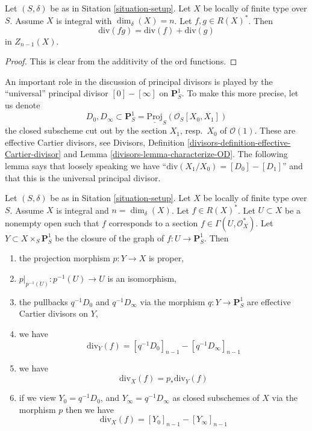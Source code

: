 \begin{lemma}
\label{lemma-div-additive}
Let $(S, \delta)$ be as in Sitation \ref{situation-setup}.
Let $X$ be locally of finite type over $S$. Assume $X$ is
integral with $\dim_\delta(X) = n$.
Let $f, g \in R(X)^*$.
Then
$$
\text{div}(fg) = \text{div}(f) + \text{div}(g)
$$
in $Z_{n - 1}(X)$.
\end{lemma}

\begin{proof}
This is clear from the additivity of the $\text{ord}$ functions.
\end{proof}

\noindent
An important role in the discussion of principal divisors
is played by the ``universal'' principal divisor $[0] - [\infty]$
on $\mathbf{P}^1_S$. To make this more precise, let us denote
$$
D_0, D_\infty \subset
\mathbf{P}^1_S = \underline{\text{Proj}}_S(\mathcal{O}_S[X_0, X_1])
$$
the closed subscheme cut out by the section $X_1$, resp.\ $X_0$
of $\mathcal{O}(1)$. These are effective Cartier divisors, see
Divisors, Definition \ref{divisors-definition-effective-Cartier-divisor}
and Lemma \ref{divisors-lemma-characterize-OD}.
The following lemma says that loosely speaking we have
``$\text{div}(X_1/X_0) = [D_0] - [D_1]$'' and that this is the
universal principal divisor.

\begin{lemma}
\label{lemma-rational-function}
Let $(S, \delta)$ be as in Sitation \ref{situation-setup}.
Let $X$ be locally of finite type over $S$. Assume $X$ is
integral and $n = \dim_\delta(X)$. Let $f \in R(X)^*$.
Let $U \subset X$ be a nonempty open such that $f$
corresponds to a section $f \in \Gamma(U, \mathcal{O}_X^*)$.
Let $Y \subset X \times_S \mathbf{P}^1_S$ be the
closure of the graph of $f : U \to \mathbf{P}^1_S$.
Then
\begin{enumerate}
\item the projection morphism $p : Y \to X$ is proper,
\item $p|_{p^{-1}(U)} : p^{-1}(U) \to U$ is an isomorphism,
\item the pullbacks $q^{-1}D_0$ and $q^{-1}D_\infty$ via the morphism
$q : Y \to \mathbf{P}^1_S$ are effective Cartier divisors on $Y$,
\item we have
$$
\text{div}_Y(f) = [q^{-1}D_0]_{n - 1} - [q^{-1}D_\infty]_{n - 1}
$$
\item we have
$$
\text{div}_X(f) = p_*\text{div}_Y(f)
$$
\item if we view $Y_0 = q^{-1}D_0$, and
$Y_\infty = q^{-1}D_\infty$ as closed subschemes of $X$
via the morphism $p$ then we have
$$
\text{div}_X(f) = [Y_0]_{n - 1} - [Y_\infty]_{n - 1}
$$
\end{enumerate}
\end{lemma}

